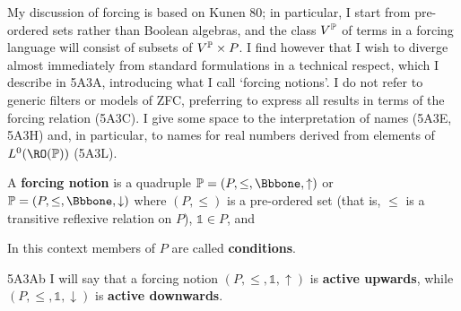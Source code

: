 
\Loadfourteens

\def\chaptername{Appendix}
\def\sectionname{Forcing}

\def\uBp{\Cal{U}\mskip-1mu\widehat{\Cal B}}


My discussion of forcing is based on {\smc Kunen 80};  in particular,
I start from pre-ordered sets rather than Boolean algebras, and the class
$V^{\Bbb P}$ of terms in a forcing language will consist of subsets of
$V^{\Bbb P}\times P$.   I find however that I wish to diverge almost
immediately from standard formulations in a technical respect, which I
describe in 5A3A, introducing what I call `forcing notions'.
I do not refer to generic filters or models of ZFC, preferring to express
all results in terms of the forcing relation (5A3C).   I give some space to
the interpretation of names (5A3E, 5A3H) and, in particular, to names for
real numbers derived from elements of $L^0(\RO(\Bbb P))$ (5A3L).

A {\bf forcing notion} is a quadruple
$\Bbb P=(P,\le,\Bbbone,\uparrow)$ or $\Bbb P=(P,\le,\Bbbone,\downarrow)$
where $(P,\le)$ is a pre-ordered set (that is, $\le$ is a transitive
reflexive relation on $P$), $\Bbbone\in P$, and


\noindent In this context members of $P$ are called
{\bf conditions}.

\spheader 5A3Ab I will say that a forcing notion
$(P,\le,\Bbbone,\uparrow)$ is {\bf active upwards}, while
$(P,\le,\Bbbone,\downarrow)$ is {\bf active downwards}.

